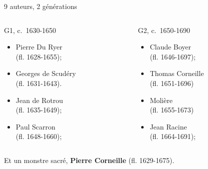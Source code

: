 \documentclass{beamer}
\begin{document}
\begin{frame}{9 auteurs, 2 générations}
	\begin{columns}[T]
		\begin{column}{0.45\textwidth}
			G1, c.~1630-1650
			\begin{itemize}
			    \item Pierre Du Ryer \\(fl. 1628-1655);
			    \item Georges de Scudéry\\ (fl. 1631-1643).
				\item Jean de Rotrou\\ (fl. 1635-1649);
				\item Paul Scarron\\ (fl. 1648-1660);
			\end{itemize}
		\end{column}
		\begin{column}{0.45\textwidth}
			G2, c.~1650-1690
			\begin{itemize}
				\item Claude Boyer\\ (fl. 1646-1697);
				\item Thomas Corneille\\ (fl. 1651-1696)
				\item Molière\\ (fl. 1655-1673)
				\item Jean Racine\\ (fl. 1664-1691);
			\end{itemize}
		
		\end{column}
	\end{columns}
	
			Et un monstre sacré, \textbf{Pierre Corneille} (fl. 1629-1675).
	
\end{frame}
\end{document}
